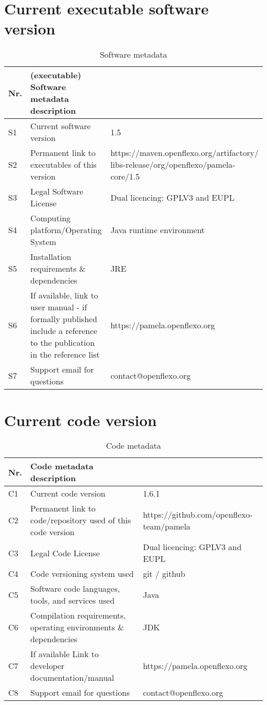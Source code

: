 \documentclass[preprint]{elsarticle}
\begin{document}
\section*{Current executable software version}
\label{}

\begin{table}[!h]
\begin{tabular}{|l|p{6.5cm}|p{6.5cm}|}
\hline
\textbf{Nr.} & \textbf{(executable) Software metadata description} &  \\
\hline
S1 & Current software version & 1.5 \\
\hline
S2 & Permanent link to executables of this version  & https://maven.openflexo.org/artifactory/
libs-release/org/openflexo/pamela-core/1.5 \\
\hline
S3 & Legal Software License & Dual licencing: GPLV3 and EUPL \\
\hline
S4 & Computing platform/Operating System & Java runtime environment \\
\hline
S5 & Installation requirements \& dependencies & JRE \geq 1.6\\
\hline
S6 & If available, link to user manual - if formally published include a reference to the publication in the reference list & https://pamela.openflexo.org\\
\hline
S7 & Support email for questions & contact@openflexo.org\\
\hline
\end{tabular}
\caption{Software metadata}
\label{} 
\end{table}

\section*{Current code version}
\label{}

\begin{table}[!h]
\begin{tabular}{|l|p{6.5cm}|p{6.5cm}|}
\hline
\textbf{Nr.} & \textbf{Code metadata description} &  \\
\hline
C1 & Current code version & 1.6.1 \\
\hline
C2 & Permanent link to code/repository used of this code version & https://github.com/openflexo-team/pamela \\
\hline
C3 & Legal Code License   & Dual licencing: GPLV3 and EUPL \\
\hline
C4 & Code versioning system used & git / github \\
\hline
C5 & Software code languages, tools, and services used & Java \\
\hline
C6 & Compilation requirements, operating environments \& dependencies & JDK \geq 1.6\\
\hline
C7 & If available Link to developer documentation/manual & https://pamela.openflexo.org \\
\hline
C8 & Support email for questions & contact@openflexo.org\\
\hline
\end{tabular}
\caption{Code metadata}
\label{} 
\end{table}
\end{document}
